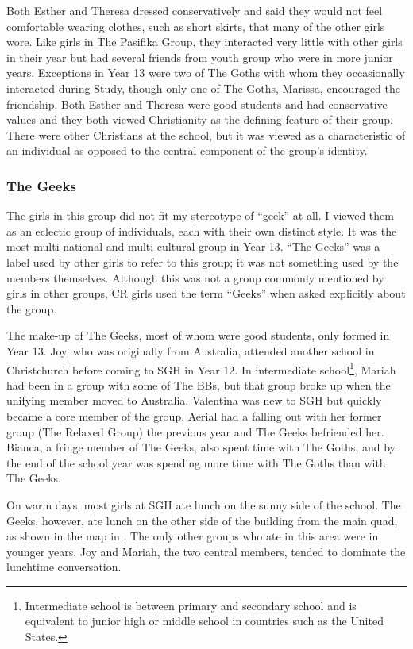 Both Esther and Theresa dressed conservatively and said they would not feel comfortable wearing clothes, such as short skirts, that many of the other girls wore. Like girls in The Pasifika Group, they interacted very little with other girls in their year but had several friends from youth group who were in more junior years. Exceptions in Year 13 were two of The Goths with whom they occasionally interacted during Study, though only one of The Goths, Marissa, encouraged the friendship. Both Esther and Theresa were good students and had conservative values and they both viewed Christianity as the defining feature of their group. There were other Christians at the school, but it was viewed as a characteristic of an individual as opposed to the central component of the group's identity.
 
\subsubsection{The Geeks}\label{geeks}

The girls in this group did not fit my stereotype of ``geek'' at all. I viewed them as an eclectic group of individuals, each with their own distinct style. It was the most multi-national and multi-cultural group in Year 13. ``The Geeks'' was a label used by other girls to refer to this group; it was not something used by the members themselves. Although this was not a group commonly mentioned by girls in other groups, CR girls used the term ``Geeks'' when asked explicitly about the group. 

The make-up of The Geeks, most of whom were good students, only formed in Year 13. Joy, who was originally from Australia, attended another school in Christchurch before coming to SGH in Year 12. In intermediate school\footnote{Intermediate school is between primary and secondary school and is equivalent to junior high or middle school in countries such as the United States.}, Mariah had been in a group with some of The BBs, but that group broke up when the unifying member moved to Australia. Valentina was new to SGH but quickly became a core member of the group. Aerial had a falling out with her former group (The Relaxed Group) the previous year and The Geeks befriended her. Bianca, a fringe member of The Geeks, also spent time with The Goths, and by the end of the school year was spending more time with The Goths than with The Geeks. 

On warm days, most girls at SGH ate lunch on the sunny side of the school. The Geeks, however, ate lunch on the other side of the building from the main quad, as shown in the map in . The only other groups who ate in this area were in younger years. Joy and Mariah, the two central members, tended to dominate the lunchtime conversation. 

